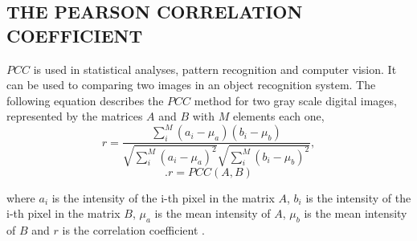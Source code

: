 
\subsection{THE PEARSON CORRELATION COEFFICIENT}

$PCC$ is used in statistical analyses, pattern recognition and computer vision. 
It can be used to comparing two images in an object recognition system. 
The following equation describes the $PCC$ method for two gray scale digital images\cite{Eugene},
represented by the matrices $A$ and $B$ with $M$ elements each one,
\begin{equation}
r = \frac{\sum \limits_{i}^{M} (a_i-\mu_a)(b_i-\mu_b)}{\sqrt{\sum \limits_{i}^{M} (a_i-\mu_a)^2} \sqrt{\sum\limits_{i}^{M} (b_i-\mu_b)^2}},
\end{equation}
\begin{equation}\label{eq:PCC}.
 r=PCC(A,B)
\end{equation}

where $a_i$ is the intensity of the i-th pixel in the  matrix $A$, 
$b_i$ is the intensity of the i-th pixel in the matrix $B$, 
$\mu_a$ is the mean intensity of $A$,
$\mu_b$ is the mean intensity of $B$ and
$r$ is the correlation coefficient \cite{Miranda Neto}.

